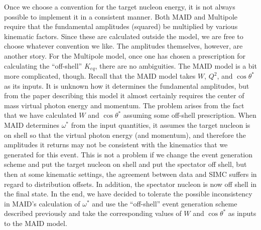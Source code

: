 Once we choose a convention for the target nucleon energy, it is not always 
possible to implement it in a consistent manner.  Both MAID and Multipole
require that the fundamental amplitudes (squared) be multiplied by various
kinematic factors.  Since these are calculated outside the model, we are free
to choose whatever convention we like.  The amplitudes themselves, however,
are another story. 
For the Multipole model, once one has chosen a prescription
for calculating the ``off-shell'' $K_{eq}$, there are no ambiguities.  The 
MAID model is a bit more complicated, though.  Recall that the MAID model 
takes $W$, $Q^2$, and $\cos{\theta^*}$ as its inputs.  It is unknown how it 
determines the fundamental amplitudes, but from the paper describing this 
model it almost certainly requires the center of mass virtual photon energy 
and momentum.  The 
problem arises from the fact that we have calculated $W$ and $\cos{\theta^*}$
assuming some off-shell prescription.  When MAID determines $\omega^*$ 
from the input quantities, it assumes the target nucleon is on shell so that 
the virtual photon energy (and momentum), and therefore the
amplitudes it returns may not be consistent with the kinematics that we 
generated for this event.
This is not a problem if we change the event 
generation scheme and put the target nucleon on shell and put the spectator 
off shell, but then at some kinematic settings, the agreement between data and
SIMC suffers in regard to distribution offsets.  In addition, the spectator 
nucleon is now off shell in the final state.  In the end, we have decided to
tolerate the possible inconsistency in MAID's calculation of $\omega^*$ and
use the ``off-shell'' event generation scheme described previously and take the
corresponding values of $W$ and $\cos{\theta^*}$ as inputs to the MAID model.

